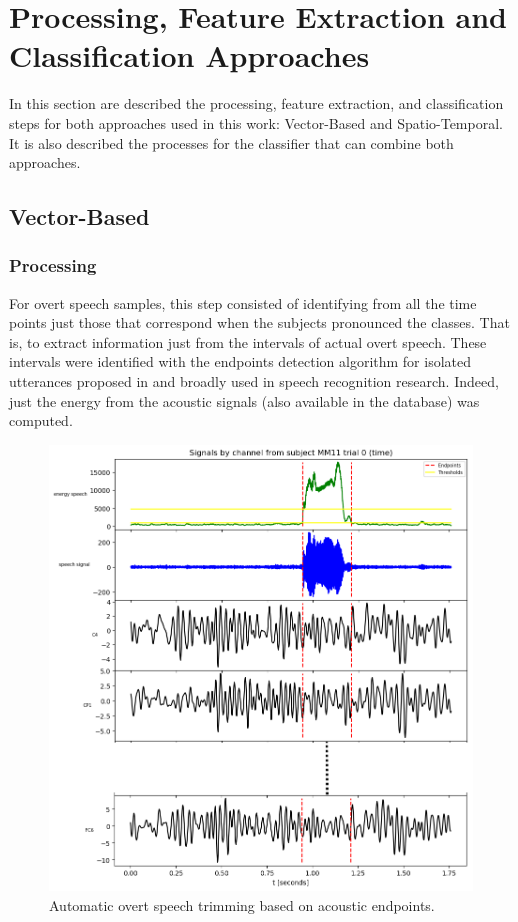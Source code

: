 \section[Processing, Feature Extraction and Classification Approaches]{\texorpdfstring{Processing, Feature Extraction and\\ Classification Approaches}{Processing, Feature Extraction and Classification Approaches}}
In this section are described the processing, feature extraction, and classification steps for both approaches used in this work: Vector-Based and Spatio-Temporal. It is also described the processes for the classifier that can combine both approaches.

\subsection{Vector-Based}
\subsubsection{Processing}
For overt speech samples, this step consisted of identifying from all the time points just those that correspond when the subjects pronounced the classes. That is, to extract information just from the intervals of actual overt speech. These intervals were identified with the endpoints detection algorithm for isolated utterances proposed in \cite{rabiner1975algorithm} and broadly used in speech recognition research.  Indeed, just the energy from the acoustic signals (also available in the database) was computed.\\

\begin{figure}[h!]
	\includegraphics[scale=0.4]{Figures/Overt_speech_trim.png}
	\centering
	\caption{Automatic overt speech trimming based on acoustic endpoints.}
	\label{Fig: Trimming}
\end{figure}

